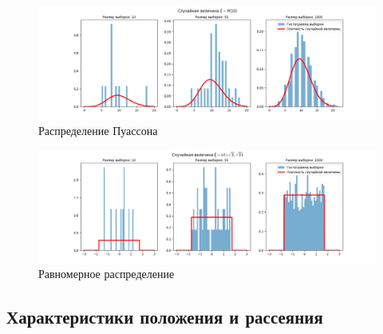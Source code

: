\documentclass[12pt]{article}
\begin{document}
\begin{figure}[!hbt]
  \centering
  \includegraphics[width=0.8\paperwidth ]{../images/histogram/poisson.png}
  \caption{Распределение Пуассона}
\end{figure}

\begin{figure}[!hbt]
  \centering
  \includegraphics[width=0.8\paperwidth ]{../images/histogram/uniform.png}
  \caption{Равномерное распределение}
\end{figure}

\FloatBarrier
\subsection{Характеристики положения и рассеяния}
\end{document}
